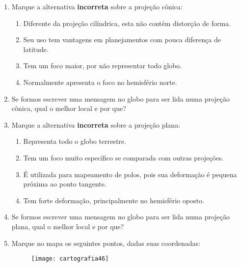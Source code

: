 {\begin{enumerate}
\begin{figure}[H]
\end{figure}

\begin{enumerate}
\item ($30^{\circ}$S; $30^{\circ}$L)
\item ($0^{\circ}$N; $0^{\circ}$O)
\item ($60^{\circ}$N; $150^{\circ}$O)
\item ($90^{\circ}$N; $120^{\circ}$L)
\end{enumerate}

\item Marque a alternativa \textbf{incorreta} sobre a projeção cônica:
\begin{enumerate}
\item Diferente da projeção cilíndrica, esta não contém distorção de forma.
\item Seu uso tem vantagens em planejamentos com pouca diferença de latitude.
\item Tem um foco maior, por não representar todo globo.
\item Normalmente apresenta o foco no hemisfério norte.
\end{enumerate}

\item Se formos escrever uma mensagem no globo para ser lida numa projeção cônica, qual o melhor local e por que?



\item Marque a alternativa \textbf{incorreta} sobre a projeção plana:
\begin{enumerate}
\item Representa todo o globo terrestre.
\item Tem um foco muito específico se comparada com outras projeções.
\item É utilizada para mapeamento de polos, pois sua deformação é pequena próxima ao ponto tangente.
\item Tem forte deformação, principalmente no hemisfério oposto.
\end{enumerate}

\item Se formos escrever uma mensagem no globo para ser lida numa projeção plana, qual o melhor local e por que?

\item Marque no mapa os seguintes pontos, dadas suas coordenadas:

\begin{figure}[H]
\centering
\texttt{[image: cartografia46]}


\end{figure}
\end{enumerate}}
